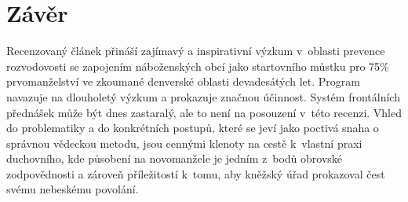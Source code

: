 \vspace{15mm}
\chapter{Závěr}

Recenzovaný článek přináší zajímavý a inspirativní výzkum v~oblasti prevence
rozvodovosti se zapojením náboženských obcí jako startovního můstku pro 75\%
prvomanželství ve zkoumané denverské oblasti devadesátých let. Program navazuje
na dlouholetý výzkum a prokazuje značnou účinnost. Systém frontálních přednášek
může být dnes zastaralý, ale to není na posouzení v~této recenzi. Vhled do problematiky a do
konkrétních postupů, které se jeví jako poctivá snaha o správnou vědeckou
metodu, jsou cennými klenoty na cestě k~vlastní praxi duchovního, kde působení
na novomanžele je jedním z~bodů obrovské zodpovědnosti a zároveň příležitostí
k~tomu, aby kněžský úřad prokazoval čest svému nebeskému povolání.
